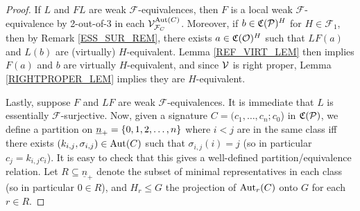 \documentclass[a4paper,10pt
,draft
]{article}%
\renewcommand{\F}{\mathcal F}
\renewcommand{\1}{\eta}%
\begin{document}
\begin{proof}
      If $L$ and $FL$ are weak $\F$-equivalences,
      then $F$ is a local weak $\F$-equivalence by 2-out-of-3 in each $\V^{\Aut(C)}_{\F_C}$.
      Moreover, if $b \in \mathfrak C(\P)^H$ for $H \in \F_1$, then by Remark \ref{ESS_SUR_REM}, there exists $a \in \mathfrak C(\O)^H$ such that
      $LF(a)$ and $L(b)$ are (virtually) $H$-equivalent.
      Lemma \ref{REF_VIRT_LEM} then implies $F(a)$ and $b$ are virtually $H$-equivalent, 
      and since $\V$ is right proper, Lemma \ref{RIGHTPROPER_LEM} implies they are $H$-equivalent.

      Lastly, suppose $F$ and $LF$ are weak $\F$-equivalences.
      It is immediate that $L$ is essentially $\F$-surjective.
      Now, given a signature $C = (c_1,\ldots,c_n;c_0$) in $\C(\P)$,
      we define a partition on $\underline{n}_+ = \set{0,1,2,\dots,n}$ where
      $i < j$ are in the same class iff there exists $(k_{i,j}, \sigma_{i,j}) \in \Aut(C)$ such that
      $\sigma_{i,j}(i) = j$ (so in particular $c_j = k_{i,j} c_i$).
      It is easy to check that this gives a well-defined partition/equivalence relation.
      Let $R \subseteq \underline{n}_+$ denote the subset of minimal representatives in each class
      (so in particular $0 \in R$),
      and $H_r \leq G$ the projection of $\Aut_r(C)$ onto $G$ for each $r \in R$.
      

\end{proof}
\end{document}
